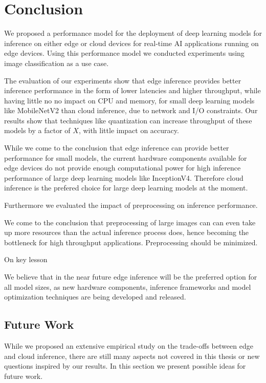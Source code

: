 \chapter{Conclusion}
\label{chap:conclusion}
%
We proposed a performance model for the deployment of deep learning models for inference on either edge or cloud devices for real-time AI applications running on edge devices.
Using this performance model we conducted experiments using image classification as a use case.

The evaluation of our experiments show that edge inference provides better inference performance in the form of lower latencies and higher throughput, while having little no no impact on CPU and memory, for small deep learning models like MobileNetV2 than cloud inference, due to network and I/O constraints. 
Our results show that techniques like quantization can increase throughput of these models by a factor of $X$, with little impact on accuracy.

While we come to the conclusion that edge inference can provide better performance for small models, the current hardware components available for edge devices do not provide enough computational power for high inference performance of large deep learning models like InceptionV4.
Therefore cloud inference is the prefered choice for large deep learning models at the moment.



Furthermore we evaluated the impact of preprocessing on inference performance.



We come to the conclusion that preprocessing of large images can can even take up more resources than the actual inference process does, hence becoming the bottleneck for high throughput applications.
Preprocessing should be minimized.


On key lesson



We believe that in the near future edge inference will be the preferred option for all model sizes, as new hardware components, inference frameworks and model optimization techniques are being developed and released.
\section{Future Work}
While we proposed an extensive empirical study on the trade-offs between edge and cloud inference, there are still many aspects not covered in this thesis or new questions inspired by our results. 
In this section we present possible ideas for future work.
